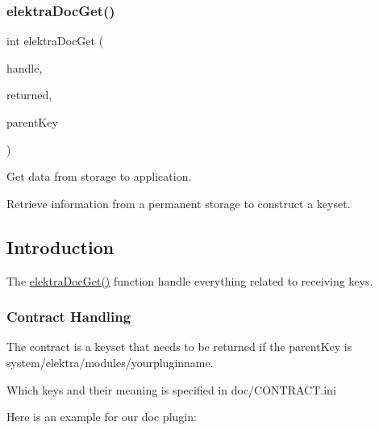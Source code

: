 \subsubsection{\texorpdfstring{elektra\+Doc\+Get()}{elektraDocGet()}}
{\footnotesize\ttfamily int elektra\+Doc\+Get (\begin{DoxyParamCaption}\item[{Plugin $\ast$}]{handle,  }\item[{Key\+Set $\ast$}]{returned,  }\item[{Key $\ast$}]{parent\+Key }\end{DoxyParamCaption})}



Get data from storage to application. 

Retrieve information from a permanent storage to construct a keyset.\hypertarget{group__plugin_intro}{}\subsection{Introduction}\label{group__plugin_intro}
The \hyperlink{group__plugin_gacb69f3441c6d84241b4362f958fbe313}{elektra\+Doc\+Get()} function handle everything related to receiving keys.\hypertarget{group__plugin_contract}{}\subsubsection{Contract Handling}\label{group__plugin_contract}
The contract is a keyset that needs to be returned if the parent\+Key is system/elektra/modules/yourpluginname.

Which keys and their meaning is specified in doc/\+C\+O\+N\+T\+R\+A\+C\+T.\+ini

Here is an example for our doc plugin\+:


